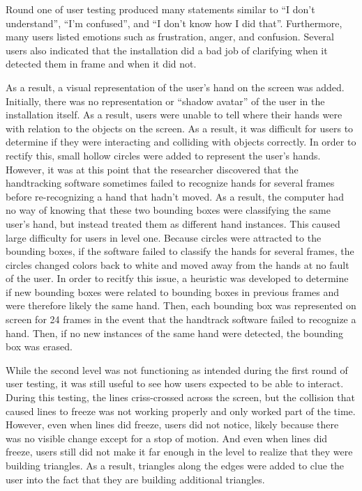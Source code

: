 \documentclass[10pt,twocolumn]{article}
\begin{document}
Round one of user testing produced many statements similar to ``I don't understand'', ``I'm confused'', and ``I don't know how I did that''.  Furthermore, many users listed emotions such as frustration, anger, and confusion. Several users also indicated that the installation did a bad job of clarifying when it detected them in frame and when it did not. 

As a result, a visual representation of the user's hand on the screen was added.  Initially, there was no representation or ``shadow avatar'' of the user in the installation itself. As a result, users were unable to tell where their hands were with relation to the objects on the screen.  As a result, it was difficult for users to determine if they were interacting and colliding with objects correctly. In order to rectify this, small hollow circles were added to represent the user's hands. However, it was at this point that the researcher discovered that the handtracking software sometimes failed to recognize hands for several frames before re-recognizing a hand that hadn't moved.  As a result, the computer had no way of knowing that these two bounding boxes were classifying the same user's hand, but instead treated them as different hand instances.  This caused large difficulty for users in level one. Because circles were attracted to the bounding boxes, if the software failed to classify the hands for several frames, the circles changed colors back to white and moved away from the hands at no fault of the user.  In order to recitfy this issue, a heuristic was developed to determine if new bounding boxes were related to bounding boxes in previous frames and were therefore likely the same hand.  Then, each bounding box was represented on screen for 24 frames in the event that the handtrack software failed to recognize a hand.  Then, if no new instances of the same hand were detected, the bounding box was erased. 

While the second level was not functioning as intended during the first round of user testing, it was still useful to see how users expected to be able to interact.  During this testing, the lines criss-crossed across the screen, but the collision that caused lines to freeze was not working properly and only worked part of the time.  However, even when lines did freeze, users did not notice, likely because there was no visible change except for a stop of motion. And even when lines did freeze, users still did not make it far enough in the level to realize that they were building triangles.  As a result, triangles along the edges were added to clue the user into the fact that they are building additional triangles. 
\end{document}
